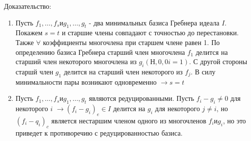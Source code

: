 \documentclass[12pt]{article}
\begin{document}
Доказательство:
\begin{enumerate}
	\item Пусть $f_1,\dots,f_s и g_1,\dots,g_t$ - два минимальных базиса Гребнера идеала $I$. Покажем $s = t$ и старшие члены совпадают с точностью до перестановки. Также $\forall$ коэффициенты многочлена при старшем члене равен 1. По определению базиса Гребнера старший член многочлена $f_1$ делится на старший член некоторого многочлена из $g_i (Н,0,0 i = 1)$. С другой стороны старшй член $g_1$ делится на старший член некоторого из $f_j$. В силу минимальности пары возникают одновременно $\rightarrow s = t$
	\item Пусть $f_1,\dots,f_s и g_1,\dots,g_t$ являются редуцированными. Пусть $f_i - g_i \neq 0$ для некоторого $i$ $\rightarrow (f_i - g_i)_e \in I$ делится на $g_i$ для некоторого $j \neq i$, но $(f_i - q_i)_c$ является нестаршим членом одного из многочленов $f_i и g_i$, но это приведет к противоречию с редуцированностью базиса. 
\end{enumerate}






    
\end{document}
